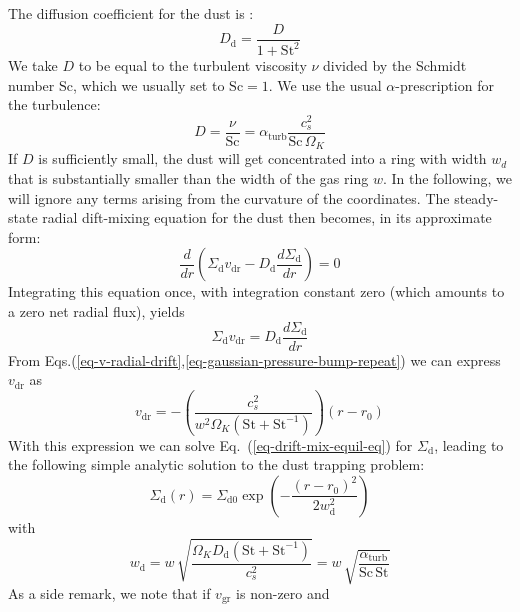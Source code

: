 \documentclass{aa}
\begin{document}
The diffusion
coefficient for the dust is \citep{2007Icar..192..588Y}:
\begin{equation}
D_{\mathrm{d}} = \frac{D}{1+\mathrm{St}^2}
\end{equation}
We take $D$ to be equal to the turbulent viscosity $\nu$ divided by the
Schmidt number $\mathrm{Sc}$, which we usually set to $\mathrm{Sc}=1$.
We use the usual $\alpha$-prescription for the turbulence:
\begin{equation}
D=\frac{\nu}{\mathrm{Sc}}= \alpha_{\mathrm{turb}}\frac{c_s^2}{\mathrm{Sc}\,\Omega_K}
\end{equation}
If $D$ is sufficiently small, the dust will get concentrated into a ring with
width $w_d$ that is substantially smaller than the width of the gas ring
$w$. In the following, we will ignore any terms
arising from the curvature of the coordinates. The steady-state radial
dift-mixing equation for the dust then becomes, in its approximate form:
\begin{equation}
  \frac{d}{dr}
  \left(\Sigma_{\mathrm{d}}v_{\mathrm{dr}}-D_{\mathrm{d}}\frac{d\Sigma_{\mathrm{d}}}{dr}\right) = 0
\end{equation}
Integrating this equation once, with integration constant zero (which
amounts to a zero net radial flux), yields
\begin{equation}\label{eq-drift-mix-equil-eq}
  \Sigma_{\mathrm{d}}v_{\mathrm{dr}} = D_{\mathrm{d}}\frac{d\Sigma_{\mathrm{d}}}{dr}
\end{equation}
From Eqs.(\ref{eq-v-radial-drift},\ref{eq-gaussian-pressure-bump-repeat}) we can express
$v_{\mathrm{dr}}$ as
\begin{equation}
v_{\mathrm{dr}} = -\left(\frac{c_s^2}{w^2\Omega_K(\mathrm{St}+\mathrm{St}^{-1})}\right)(r-r_0)
\end{equation}
With this expression we can solve Eq.~(\ref{eq-drift-mix-equil-eq}) for
$\Sigma_{\mathrm{d}}$, leading to the following simple analytic solution to the dust
trapping problem:
\begin{equation}\label{eq-analytic-sol-radial-trapping}
\Sigma_{\mathrm{d}}(r) = \Sigma_{\mathrm{d0}} \exp\left(-\frac{(r-r_0)^2}{2w_{\mathrm{d}}^2}\right)
\end{equation}
with 
\begin{equation}
  w_{\mathrm{d}} = w\, \sqrt{\frac{\Omega_KD_{\mathrm{d}}(\mathrm{St}+\mathrm{St}^{-1})}{c_s^2}}
  = w\,\sqrt{\frac{\alpha_{\mathrm{turb}}}{\mathrm{Sc}\,\mathrm{St}}}
\end{equation}
As a side remark, we note that if $v_{\mathrm{gr}}$ is non-zero and
\end{document}
